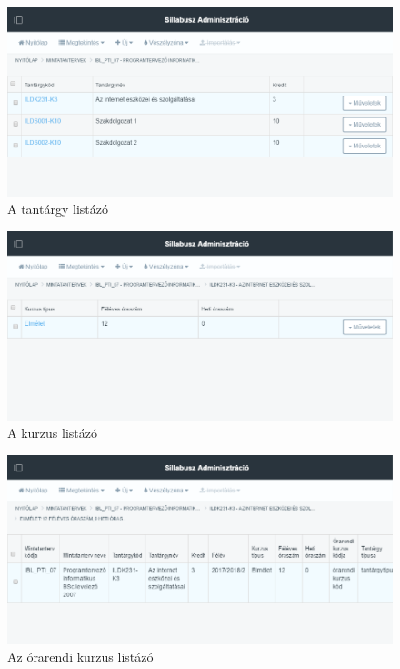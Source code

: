 \documentclass[hidelinks, 12pt, a4paper]{report}
\begin{document}
\begin{figure}[H]
    \centering
	\includegraphics[width=\textwidth]{sm_subject_list.png}
	\caption{A tantárgy listázó}
\end{figure}

\begin{figure}[H]
    \centering
	\includegraphics[width=\textwidth]{sm_course_list.png}
	\caption{A kurzus listázó}
\end{figure}

\begin{figure}[H]
    \centering
	\includegraphics[width=\textwidth]{sm_timetable_course_list.png}
	\caption{Az órarendi kurzus listázó}
\end{figure}
\end{document}

